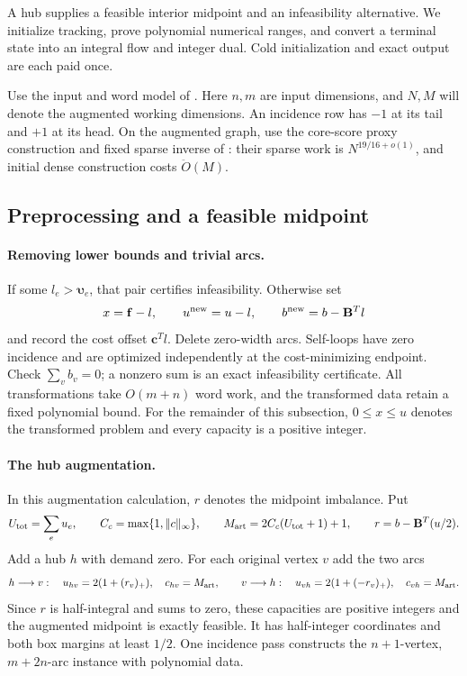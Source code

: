 \documentclass[11pt]{article}
\theoremstyle{remark}
\newcommand{\BB}{\mathbf B}
\newcommand{\cc}{\mathbf c}
\newcommand{\ff}{\mathbf f}
\newcommand{\vvu}{\boldsymbol{\upsilon}}
\newcommand{\norm}[1]{\lVert#1\rVert}
\renewcommand{\O}{\ddot{O}}
\begin{document}
A hub supplies a feasible interior midpoint and an infeasibility alternative.
We initialize tracking, prove polynomial numerical ranges, and convert a
terminal state into an integral flow and integer dual.
Cold initialization and exact output are each paid once.

Use the input and word model of .
Here $n,m$ are input dimensions, and $N,M$ will denote the augmented working
dimensions.
An incidence row has $-1$ at its tail and $+1$ at its head.
On the augmented graph, use the core-score proxy construction and fixed sparse
inverse of : their sparse work is $N^{19/16+o(1)}$, and initial dense construction costs $\O(M)$.

\subsection{Preprocessing and a feasible midpoint}

\paragraph{Removing lower bounds and trivial arcs.}
If some $l_e>\vvu_e$, that pair certifies infeasibility.
Otherwise set
\[
 x=\ff-l,\qquad u^{\rm new}=u-l,\qquad
 b^{\rm new}=b-\BB^Tl
\]
and record the cost offset $\cc^Tl$.
Delete zero-width arcs.
Self-loops have zero incidence and are optimized independently at the
cost-minimizing endpoint.
Check $\sum_v b_v=0$; a nonzero sum is an exact infeasibility certificate.
All transformations take $O(m+n)$ word work, and the transformed data retain a
fixed polynomial bound.
For the remainder of this subsection, $0\le x\le u$ denotes the transformed
problem and every capacity is a positive integer.

\paragraph{The hub augmentation.}
In this augmentation calculation, $r$ denotes the midpoint imbalance.
Put
\[
 U_{\rm tot}=\sum_eu_e,\qquad C_c=\max\{1,\norm{c}_\infty\},
 \qquad M_{\rm art}=2C_c(U_{\rm tot}+1)+1,\qquad
 r=b-\BB^T(u/2).
\]
Add a hub $h$ with demand zero.
For each original vertex $v$ add the two arcs
\[
 h\longrightarrow v:
     \quad u_{hv}=2(1+(r_v)_+),\quad c_{hv}=M_{\rm art},
 \qquad
 v\longrightarrow h:
     \quad u_{vh}=2(1+(-r_v)_+),\quad c_{vh}=M_{\rm art}.
\]
Since $r$ is half-integral and sums to zero, these capacities are positive
integers and the augmented midpoint is exactly feasible.
It has half-integer coordinates and both box margins at least $1/2$.
One incidence pass constructs the $n+1$-vertex, $m+2n$-arc instance with
polynomial data.
\end{document}
